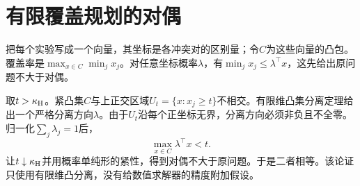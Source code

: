 \section{有限覆盖规划的对偶}
把每个实验写成一个向量，其坐标是各冲突对的区别量；令$C$为这些向量的凸包。覆盖率是$\max_{x\in C}\min_jx_j$。对任意坐标概率$\lambda$，有$\min_jx_j\le\lambda^\top x$，这先给出原问题不大于对偶。

取$t>\kappa_{\mathrm H}$。紧凸集$C$与上正交区域$U_t=\{x:x_j\ge t\}$不相交。有限维凸集分离定理给出一个严格分离方向$\lambda$。由于$U_t$沿每个正坐标无界，分离方向必须非负且不全零。归一化$\sum_j\lambda_j=1$后，
\[
 \max_{x\in C}\lambda^\top x<t.
\]
让$t\downarrow\kappa_{\mathrm H}$并用概率单纯形的紧性，得到对偶不大于原问题。于是二者相等。该论证只使用有限维凸分离，没有给数值求解器的精度附加假设。
